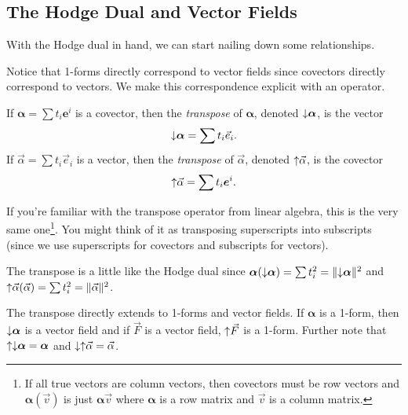 \subsection{The Hodge Dual and Vector Fields}
With the Hodge dual in hand, we can start nailing down some relationships.

Notice that 1-forms directly correspond to vector fields since covectors directly
correspond to vectors.  We make this correspondence explicit with an operator.
\begin{definition}[Transpose]
	If $\bm\alpha = \sum t_i\bm e^i$ is a covector, then the \emph{transpose}
	of $\bm\alpha$, denoted $\operatorname{\downarrow\!} \bm\alpha$, is the vector
	\[
		\operatorname{\downarrow\!} \bm\alpha = \sum t_i \vec e_i.
	\]
	If $\vec \alpha=\sum t_i\vec e_i$ is a vector, then the \emph{transpose}
	of $\vec \alpha$, denoted $\operatorname{\uparrow\!}\vec \alpha$, is the covector
	\[
		\operatorname{\uparrow\!} \vec\alpha = \sum t_i \bm e^i.
	\]
\end{definition}
If you're familiar with the transpose operator from linear algebra, this is
the very same one\footnote{
	If all true vectors are column vectors, then covectors must be row vectors
	and $\bm\alpha(\vec v)$ is just $\bm\alpha\vec v$ where $\bm\alpha$ is a row
	matrix and $\vec v$ is a column matrix.
}.  You might think of it as transposing superscripts into subscripts (since we use
superscripts for covectors and subscripts for vectors).

The transpose is a little like the Hodge dual since $\bm\alpha(\operatorname{\downarrow\!} \bm\alpha ) =
\sum t_i^2 = \lVert\operatorname{\downarrow\!} \bm\alpha\rVert^2$ and $\operatorname{\uparrow\!}\vec \alpha(\vec \alpha) = \sum t_i^2=\lVert\vec \alpha\rVert^2$.

The transpose directly extends to 1-forms and vector fields.  
If $\bm\alpha$ is a 1-form, then $\operatorname{\downarrow\!}\bm\alpha$ is a vector field and if $\vec F$
is a vector field, $\operatorname{\uparrow\!} \vec F$ is a 1-form.  Further note that $\operatorname{\uparrow\!}\operatorname{\downarrow\!} \bm\alpha = \bm\alpha$
and $\operatorname{\downarrow\!}\operatorname{\uparrow\!}\vec\alpha=\vec \alpha$.

